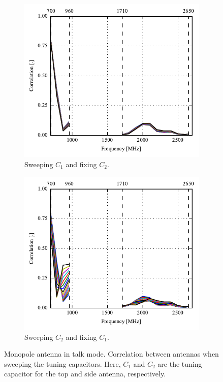 \begin{figure}[htbp]
    \centering
    \begin{subfigure}{0.49\linewidth}
        \includegraphics{img/tech_sol/monopole/talk_mode/s11_corr}
        \caption{Sweeping $C_1$ and fixing $C_2$.}
    \end{subfigure}
    \hfill
    \begin{subfigure}{0.49\linewidth}
        \includegraphics{img/tech_sol/monopole/talk_mode/s22_corr}
        \caption{Sweeping $C_2$ and fixing $C_1$.}
    \end{subfigure}
    \caption{Monopole antenna in talk mode. Correlation between antennas when sweeping the tuning capacitors. Here, $C_1$ and $C_2$ are the tuning capacitor for the top and side antenna, respectively.}
    \label{fig:corr_sol1_talk}
\end{figure}

